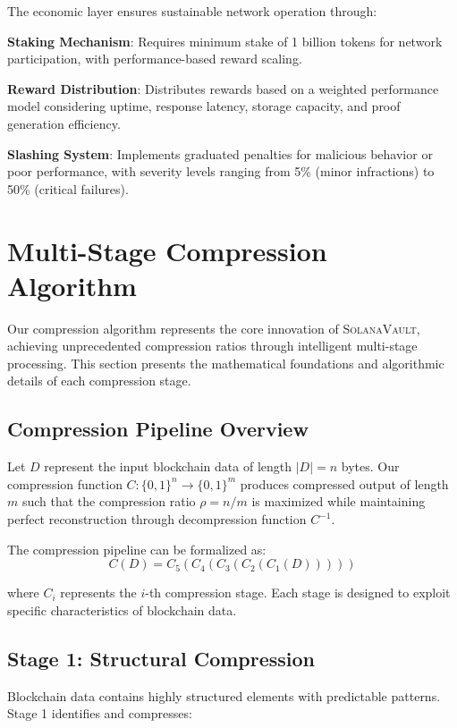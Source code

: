 \documentclass[11pt,a4paper]{article}
\newcommand{\SolanaVault}{\textsc{SolanaVault}}
\begin{document}
The economic layer ensures sustainable network operation through:

\textbf{Staking Mechanism}: Requires minimum stake of 1 billion tokens for network participation, with performance-based reward scaling.

\textbf{Reward Distribution}: Distributes rewards based on a weighted performance model considering uptime, response latency, storage capacity, and proof generation efficiency.

\textbf{Slashing System}: Implements graduated penalties for malicious behavior or poor performance, with severity levels ranging from 5\% (minor infractions) to 50\% (critical failures).

\section{Multi-Stage Compression Algorithm}
\label{sec:compression}

Our compression algorithm represents the core innovation of \SolanaVault, achieving unprecedented compression ratios through intelligent multi-stage processing. This section presents the mathematical foundations and algorithmic details of each compression stage.

\subsection{Compression Pipeline Overview}

Let $D$ represent the input blockchain data of length $|D| = n$ bytes. Our compression function $C: \{0,1\}^n \rightarrow \{0,1\}^m$ produces compressed output of length $m$ such that the compression ratio $\rho = n/m$ is maximized while maintaining perfect reconstruction through decompression function $C^{-1}$.

The compression pipeline can be formalized as:
\begin{equation}
C(D) = C_5(C_4(C_3(C_2(C_1(D)))))
\end{equation}

where $C_i$ represents the $i$-th compression stage. Each stage is designed to exploit specific characteristics of blockchain data.

\subsection{Stage 1: Structural Compression}

Blockchain data contains highly structured elements with predictable patterns. Stage 1 identifies and compresses:
\end{document}
